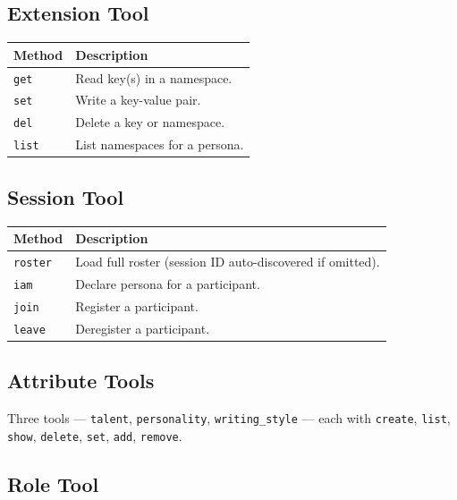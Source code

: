 \documentclass[a4paper,10pt]{article}
\newcommand{\tool}[1]{\texttt{#1}}
\begin{document}
\subsection{Extension Tool}

\begin{center}
\begin{tabular}{@{}lp{6cm}@{}}
\toprule
\textbf{Method} & \textbf{Description} \\
\midrule
\texttt{get}   & Read key(s) in a namespace. \\
\texttt{set}   & Write a key-value pair. \\
\texttt{del}   & Delete a key or namespace. \\
\texttt{list}  & List namespaces for a persona. \\
\bottomrule
\end{tabular}
\end{center}

\subsection{Session Tool}

\begin{center}
\begin{tabular}{@{}lp{6cm}@{}}
\toprule
\textbf{Method} & \textbf{Description} \\
\midrule
\texttt{roster} & Load full roster (session ID auto-discovered if
                  omitted). \\
\texttt{iam}    & Declare persona for a participant. \\
\texttt{join}   & Register a participant. \\
\texttt{leave}  & Deregister a participant. \\
\bottomrule
\end{tabular}
\end{center}

\subsection{Attribute Tools}

Three tools --- \tool{talent}, \tool{personality},
\tool{writing\_style} --- each with \texttt{create}, \texttt{list},
\texttt{show}, \texttt{delete}, \texttt{set}, \texttt{add},
\texttt{remove}.

\subsection{Role Tool}
\end{document}
